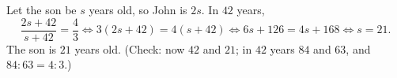 Let the son be $s$ years old, so John is $2s$. In $42$ years,
\[\dfrac{2s+42}{s+42}=\dfrac43\iff3(2s+42)=4(s+42)\iff6s+126=4s+168\iff s=21.\]
The son is $\boxed{21}$ years old. (Check: now $42$ and $21$; in $42$ years $84$ and $63$, and $84:63=4:3$.)
